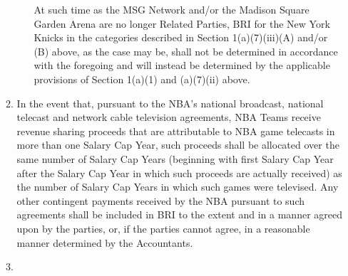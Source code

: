 \documentclass[
]{book}
\begin{document}
\begin{enumerate}
\begin{enumerate}
\begin{enumerate}
      At such time as the MSG Network and/or the Madison Square Garden Arena are no longer Related Parties, BRI for the New York Knicks in the categories described in Section 1(a)(7)(iii)(A) and/or (B) above, as the case may be, shall not be determined in accordance with the foregoing and will instead be determined by the applicable provisions of Section 1(a)(1) and (a)(7)(ii) above.
    \end{enumerate}
  \item
    In the event that, pursuant to the NBA's national broadcast, national telecast and network cable television agreements, NBA Teams receive revenue sharing proceeds that are attributable to NBA game telecasts in more than one Salary Cap Year, such proceeds shall be allocated over the same number of Salary Cap Years (beginning with first Salary Cap Year after the Salary Cap Year in which such proceeds are actually received) as the number of Salary Cap Years in which such games were televised. Any other contingent payments received by the NBA pursuant to such agreements shall be included in BRI to the extent and in a manner agreed upon by the parties, or, if the parties cannot agree, in a reasonable manner determined by the Accountants.
  \item

\end{enumerate}
\end{enumerate}
\end{document}
